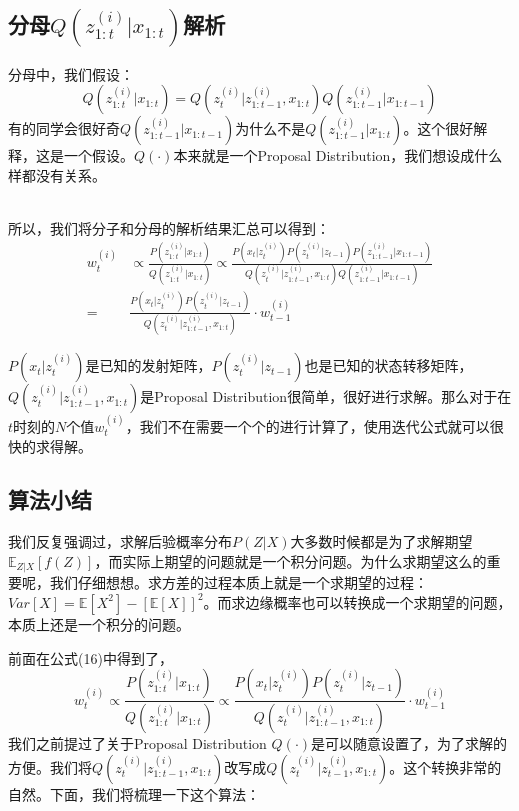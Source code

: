 \documentclass[a4paper]{article}
\begin{document}
\subsection{分母$Q(z_{1:t}^{(i)}|x_{1:t})$解析}
分母中，我们假设：
\begin{equation}
    Q(z_{1:t}^{(i)}|x_{1:t}) = Q(z_t^{(i)}|z_{1:t-1}^{(i)},x_{1:t})Q(z_{1:t-1}^{(i)}|x_{1:t-1})
\end{equation}
有的同学会很好奇$Q(z_{1:t-1}^{(i)}|x_{1:t-1})$为什么不是$Q(z_{1:t-1}^{(i)}|x_{1:t})$。这个很好解释，这是一个假设。$Q(\cdot)$本来就是一个Proposal Distribution，我们想设成什么样都没有关系。

~\\

所以，我们将分子和分母的解析结果汇总可以得到：
\begin{equation}
\begin{split}
    w_t^{(i)} & \propto \frac{P(z_{1:t}^{(i)}|x_{1:t})}{Q(z_{1:t}^{(i)}|x_{1:t})} \propto \frac{P(x_t|z_t^{(i)})P(z_t^{(i)}|z_{t-1})P(z_{1:t-1}^{(i)}|x_{1:t-1})}{Q(z_t^{(i)}|z_{1:t-1}^{(i)},x_{1:t})Q(z_{1:t-1}^{(i)}|x_{1:t-1})} \\
    = & \frac{P(x_t|z_t^{(i)})P(z_t^{(i)}|z_{t-1})}{Q(z_t^{(i)}|z_{1:t-1}^{(i)},x_{1:t})} \cdot w^{(i)}_{t-1}
\end{split}
\end{equation}

$P(x_t|z_t^{(i)})$是已知的发射矩阵，$P(z_t^{(i)}|z_{t-1})$也是已知的状态转移矩阵，$Q(z_t^{(i)}|z_{1:t-1}^{(i)},x_{1:t})$是Proposal Distribution很简单，很好进行求解。那么对于在$t$时刻的$N$个值$w_t^{(i)}$，我们不在需要一个个的进行计算了，使用迭代公式就可以很快的求得解。

\subsection{算法小结}
我们反复强调过，求解后验概率分布$P(Z|X)$大多数时候都是为了求解期望$\mathbb{E}_{Z|X}[f(Z)]$，而实际上期望的问题就是一个积分问题。为什么求期望这么的重要呢，我们仔细想想。求方差的过程本质上就是一个求期望的过程：$Var[X]=\mathbb{E}[X^2]-[\mathbb{E}[X]]^2$。而求边缘概率也可以转换成一个求期望的问题，本质上还是一个积分的问题。

前面在公式(16)中得到了，
\begin{equation}
     w_t^{(i)}  \propto \frac{P(z_{1:t}^{(i)}|x_{1:t})}{Q(z_{1:t}^{(i)}|x_{1:t})} \propto \frac{P(x_t|z_t^{(i)})P(z_t^{(i)}|z_{t-1})}{Q(z_t^{(i)}|z_{1:t-1}^{(i)},x_{1:t})} \cdot w^{(i)}_{t-1}
\end{equation}
我们之前提过了关于Proposal Distribution $Q(\cdot)$是可以随意设置了，为了求解的方便。我们将$Q(z_t^{(i)}|z_{1:t-1}^{(i)},x_{1:t})$改写成$Q(z_t^{(i)}|z_{t-1}^{(i)}, x_{1:t})$。这个转换非常的自然。下面，我们将梳理一下这个算法：
\end{document}
